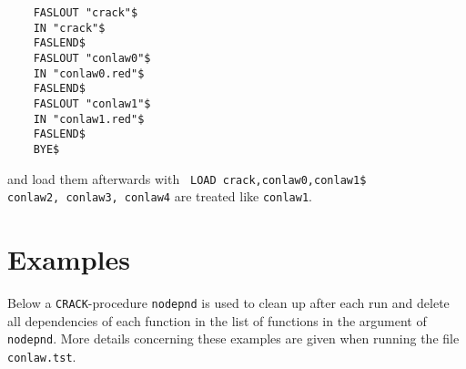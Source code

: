 \documentclass[12pt]{article}
\begin{document}
\begin{verbatim}
    FASLOUT "crack"$
    IN "crack"$
    FASLEND$
    FASLOUT "conlaw0"$
    IN "conlaw0.red"$
    FASLEND$
    FASLOUT "conlaw1"$
    IN "conlaw1.red"$
    FASLEND$
    BYE$
\end{verbatim}
and load them afterwards with \verb+ LOAD crack,conlaw0,conlaw1$+ \\
\verb+conlaw2, conlaw3, conlaw4+ are treated like {\tt conlaw1}.

\section{Examples}
Below a {\tt CRACK}-procedure {\tt nodepnd} is used to clean up 
after each run and delete all dependencies of each 
function in the list of functions in the argument of {\tt nodepnd}.
More details concerning these examples are given when running
the file {\tt conlaw.tst}.
\end{document}
